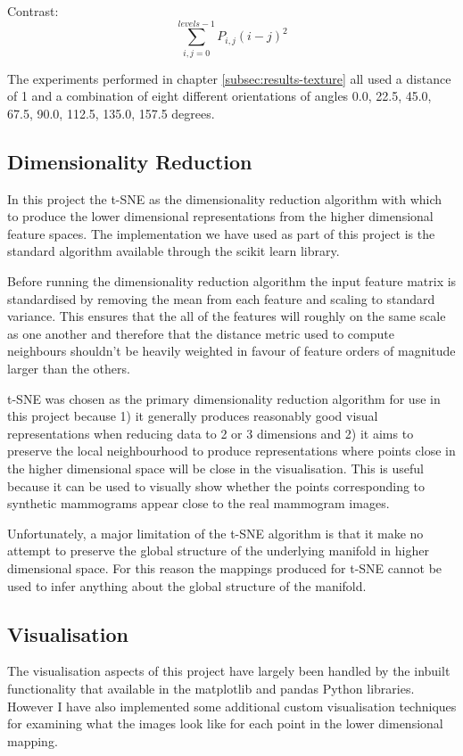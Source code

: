 Contrast:
\begin{equation}
	\sum\limits_{i,j=0}^{levels-1} P_{i,j}(i-j)^2
\end{equation}

The experiments performed in chapter \ref{subsec:results-texture} all used a distance of 1 and a combination of eight different orientations of angles 0.0, 22.5, 45.0, 67.5, 90.0, 112.5, 135.0, 157.5 degrees.


\subsection{Dimensionality Reduction}
In this project the t-SNE as the dimensionality reduction algorithm with which to produce the lower dimensional representations from the higher dimensional feature spaces. The implementation we have used as part of this project is the standard algorithm available through the scikit learn library. 

Before running the dimensionality reduction algorithm the input feature matrix is standardised by removing the mean from each feature and scaling to standard variance. This ensures that the all of the features will roughly on the same scale as one another and therefore that the distance metric used to compute neighbours shouldn't be heavily weighted in favour of feature orders of magnitude larger than the others.

t-SNE was chosen as the primary dimensionality reduction algorithm for use in this project because 1) it generally produces reasonably good visual representations when reducing data to 2 or 3 dimensions and 2) it aims to preserve the local neighbourhood to produce representations where points close in the higher dimensional space will be close in the visualisation. This is useful because it can be used to visually show whether the points corresponding to synthetic mammograms appear close to the real mammogram images.

Unfortunately, a major limitation of the t-SNE algorithm is that it make no attempt to preserve the global structure of the underlying manifold in higher dimensional space. For this reason the mappings produced for t-SNE cannot be used to infer anything about the global structure of the manifold.

\subsection{Visualisation}
The visualisation aspects of this project have largely been handled by the inbuilt functionality that available in the matplotlib and pandas Python libraries. However I have also implemented some additional custom visualisation techniques for examining what the images look like for each point in the lower dimensional mapping.

